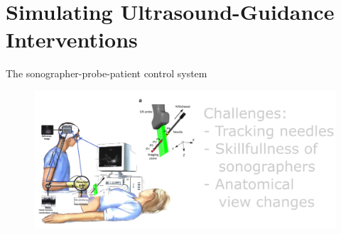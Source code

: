 


\section{Simulating Ultrasound-Guidance Interventions}


{
\begin{frame}{The sonographer-probe-patient control system}
      \begin{figure}
        \centering
        \includegraphics[width=1.0\textwidth]{./figures/sonographer-probe-patient/versions/drawing-v02.png}
      \end{figure}
\end{frame}
}





%
%
%
%
%
%
%
